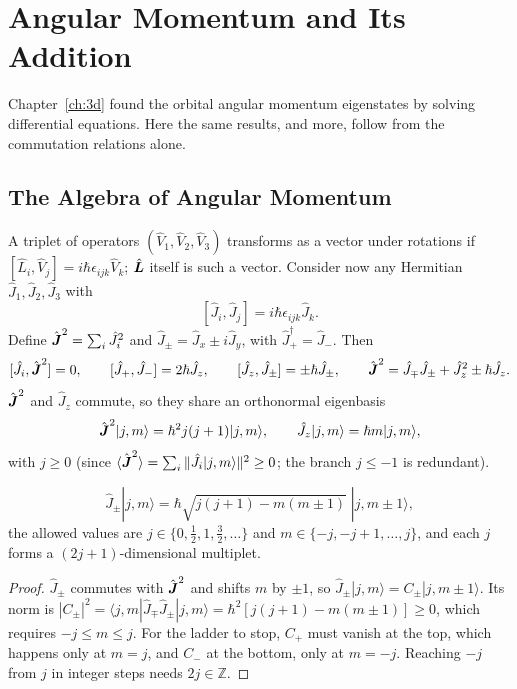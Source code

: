 \chapter{Angular Momentum and Its Addition}
\label{ch:angmom}

Chapter~\ref{ch:3d} found the orbital angular momentum eigenstates by solving differential equations. Here the same results, and more, follow from the commutation relations alone.

\section{The Algebra of Angular Momentum}

A triplet of operators $(\hat{V}_1,\hat{V}_2,\hat{V}_3)$ transforms as a vector under rotations if $[\hat{L}_i,\hat{V}_j] = i\hbar\epsilon_{ijk}\hat{V}_k$; $\hat{\bm{L}}$ itself is such a vector. Consider now any Hermitian $\hat{J}_1,\hat{J}_2,\hat{J}_3$ with
\[
    [\hat{J}_i,\hat{J}_j] = i\hbar\epsilon_{ijk}\hat{J}_k .
\]
Define $\hat{\vect{J}}^2 = \sum_i\hat{J}_i^2$ and $\hat{J}_\pm = \hat{J}_x\pm i\hat{J}_y$, with $\hat{J}_+^\dagger = \hat{J}_-$. Then
\[
    [\hat{J}_i,\hat{\vect{J}}^2] = 0,
    \qquad
    [\hat{J}_+,\hat{J}_-] = 2\hbar\hat{J}_z,
    \qquad
    [\hat{J}_z,\hat{J}_\pm] = \pm\hbar\hat{J}_\pm,
    \qquad
    \hat{\vect{J}}^2 = \hat{J}_\mp\hat{J}_\pm + \hat{J}_z^2\pm\hbar\hat{J}_z .
\]
$\hat{\vect{J}}^2$ and $\hat{J}_z$ commute, so they share an orthonormal eigenbasis
\[
    \hat{\vect{J}}^2|j,m\rangle = \hbar^2j(j+1)|j,m\rangle,
    \qquad
    \hat{J}_z|j,m\rangle = \hbar m|j,m\rangle,
\]
with $j\ge0$ (since $\langle\hat{\vect{J}}^2\rangle = \sum_i\|\hat{J}_i|j,m\rangle\|^2\ge0$; the branch $j\le-1$ is redundant).

\begin{theorem}
\[
    \hat{J}_\pm|j,m\rangle = \hbar\sqrt{j(j+1) - m(m\pm1)}\;|j,m\pm1\rangle,
\]
the allowed values are $j\in\{0,\tfrac12,1,\tfrac32,\ldots\}$ and $m\in\{-j,-j+1,\ldots,j\}$, and each $j$ forms a $(2j+1)$-dimensional multiplet.
\end{theorem}
\begin{proof}
$\hat{J}_\pm$ commutes with $\hat{\vect{J}}^2$ and shifts $m$ by $\pm1$, so $\hat{J}_\pm|j,m\rangle = C_\pm|j,m\pm1\rangle$. Its norm is $|C_\pm|^2 = \langle j,m|\hat{J}_\mp\hat{J}_\pm|j,m\rangle = \hbar^2[j(j+1)-m(m\pm1)]\ge0$, which requires $-j\le m\le j$. For the ladder to stop, $C_+$ must vanish at the top, which happens only at $m = j$, and $C_-$ at the bottom, only at $m = -j$. Reaching $-j$ from $j$ in integer steps needs $2j\in\mathbb{Z}$.
\end{proof}

